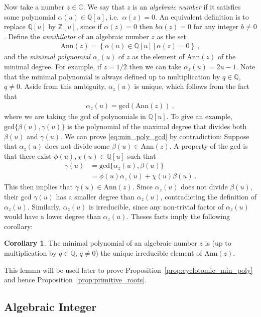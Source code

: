 \documentclass[aps,prb,twocolumn,superscriptaddress,floatfix,10pt,nofootinbib]{revtex4-2}
\newcommand{\ie}{\begin{equation}\begin{aligned}}
\newcommand{\fe}{\end{aligned}\end{equation}}
\theoremstyle{definition}
\newtheorem{corollary}[definition]{Corollary}
\begin{document}
Now take a number $z\in\mathbb{C}$. We say that $z$ is an \textit{algebraic number} if it satisfies some polynomial $\alpha(u)\in\mathbb{Q}[u]$, i.e.\ $\alpha(z)=0$. An equivalent definition is to replace $\mathbb{Q}[u]$ by $\mathbb{Z}[u]$, since if $\alpha(z)=0$ then $b\alpha(z)=0$ for any integer $b\neq0$. Define the \textit{annihilator} of an algebraic number $z$ as the set
\ie
\text{Ann}(z)=\left\{\alpha(u)\in \mathbb{Q}[u]\,|\, \alpha(z)=0\right\}~,
\fe
and the \textit{minimal polynomial} $\alpha_z(u)$ of $z$ as the element of $\text{Ann}(z)$ of the minimal degree. For example, if $z=1/2$ then we can take $\alpha_z(u)=2u-1$. Note that the minimal polynomial is always defined up to multiplication by $q\in\mathbb{Q}$, $q\neq0$. Aside from this ambiguity, $\alpha_z(u)$ is unique, which follows from the fact that
\ie\label{eq:min_poly_gcd}
\alpha_z(u)=\text{gcd}\left(\text{Ann}(z)\right)~,
\fe
where we are taking the gcd of polynomials in $\mathbb{Q}[u]$. To give an example, $\text{gcd}\{\beta(u),\gamma(u)\}$ is the polynomial of the maximal degree that divides both $\beta(u)$ and $\gamma(u)$. We can prove \eqref{eq:min_poly_gcd} by contradiction: Suppose that $\alpha_z(u)$ does not divide some $\beta(u)\in\text{Ann}(z)$. A property of the gcd is that there exist $\phi(u),\chi(u)\in\mathbb{Q}[u]$ such that
\ie
\gamma(u)&=\text{gcd}\{\alpha_z(u),\beta(u)\}\\
&=\phi(u)\alpha_z(u)+\chi(u)\beta(u)~.
\fe
This then implies that $\gamma(u)\in\text{Ann}(z)$. Since $\alpha_z(u)$ does not divide $\beta(u)$, their gcd $\gamma(u)$ has a smaller degree than $\alpha_z(u)$, contradicting the definition of $\alpha_z(u)$. Similarly, $\alpha_z(u)$ is irreducible, since any non-trivial factor of $\alpha_z(u)$ would have a lower degree than $\alpha_z(u)$. Theses facts imply the following corollary:
\begin{corollary}\label{ref:lemma_min_poly}
    The minimal polynomial of an algebraic number $z$ is (up to multiplication by $q\in \mathbb{Q}$, $q\neq0$) the unique irreducible element of $\text{Ann}(z)$.
\end{corollary}
\noindent This lemma will be used later to prove Proposition~\ref{prop:cyclotomic_min_poly} and hence Proposition~\ref{prop:primitive_roots}.

\subsection{Algebraic Integer}\label{app:3}
\end{document}
